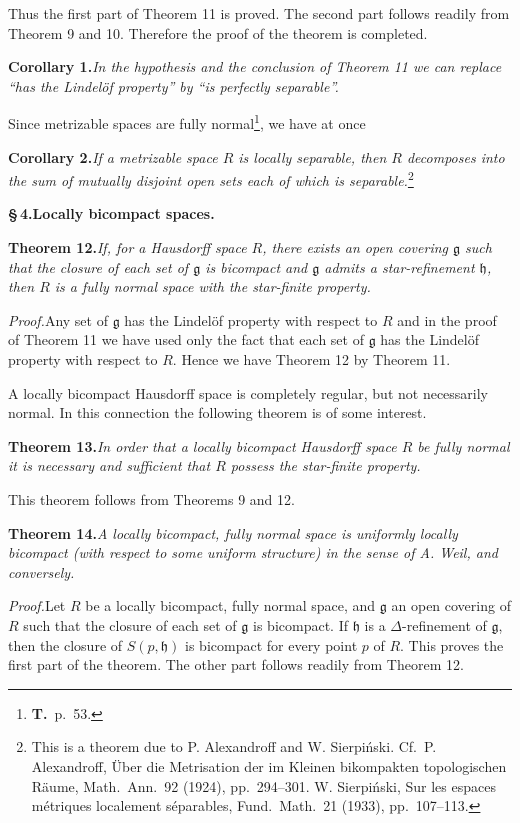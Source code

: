 \documentclass[11pt,a4paper,leqno]{article}
\newcommand{\g}{\mathfrak g}
\newcommand{\thm}[2]{\par\medskip\textbf{Theorem #1.}\quad\textit{#2}\par}
\newcommand{\proof}{\textit{Proof.}\quad}
\newcommand{\sect}[2]{\par\medskip\begin{center}\bfseries\S\,#1.\quad #2\end{center}}
\begin{document}
Thus the first part of Theorem 11 is proved. The second part follows readily from Theorem 9 and 10. Therefore the proof of the theorem is completed.

\textbf{Corollary 1.}\quad\textit{In the hypothesis and the conclusion of Theorem 11 we can replace ``has the Lindelöf property'' by ``is perfectly separable''.}

Since metrizable spaces are fully normal\footnote{\textbf{T.}\ p.\ 53.}, we have at once

\textbf{Corollary 2.}\quad\textit{If a metrizable space $R$ is locally separable, then $R$ decomposes into the sum of mutually disjoint open sets each of which is separable.}\footnote{This is a theorem due to P. Alexandroff and W. Sierpiński. Cf.\ P. Alexandroff, Über die Metrisation der im Kleinen bikompakten topologischen Räume, Math.\ Ann.\ 92 (1924), pp.\ 294--301. W. Sierpiński, Sur les espaces métriques localement séparables, Fund.\ Math.\ 21 (1933), pp.\ 107--113.}

\sect{4}{Locally bicompact spaces.}
\thm{12}{If, for a Hausdorff space $R$, there exists an open covering $\g$ such that the closure of each set of $\g$ is bicompact and $\g$ admits a star-refinement $\mathfrak h$, then $R$ is a fully normal space with the star-finite property.}

\proof Any set of $\g$ has the Lindelöf property with respect to $R$ and in the proof of Theorem 11 we have used only the fact that each set of $\g$ has the Lindelöf property with respect to $R$. Hence we have Theorem 12 by Theorem 11.

A locally bicompact Hausdorff space is completely regular, but not necessarily normal. In this connection the following theorem is of some interest.

\thm{13}{In order that a locally bicompact Hausdorff space $R$ be fully normal it is necessary and sufficient that $R$ possess the star-finite property.}

This theorem follows from Theorems 9 and 12.

\thm{14}{A locally bicompact, fully normal space is uniformly locally bicompact (with respect to some uniform structure) in the sense of A. Weil\footnotemark, and conversely.}

\proof Let $R$ be a locally bicompact, fully normal space, and $\g$ an open covering of $R$ such that the closure of each set of $\g$ is bicompact. If $\mathfrak h$ is a $\Delta$-refinement of $\g$, then the closure of $S(p,\mathfrak h)$ is bicompact for every point $p$
\newpage
{}
\noindent of $R$. This proves the first part of the theorem. The other part follows readily from Theorem 12.
\end{document}
